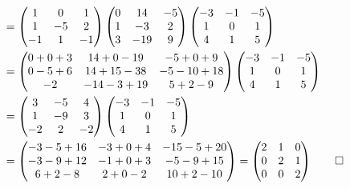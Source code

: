 \begin{loesung}
\begin{align*}
&=
\begin{pmatrix}
   1&  0&  1\\
   1& -5&  2\\
  -1&  1& -1
\end{pmatrix}
\begin{pmatrix}
    0&  14&  -5\\
    1&  -3&   2\\
    3& -19&   9
\end{pmatrix}
\begin{pmatrix}
  -3& -1& -5\\
   1&  0&  1\\
   4&  1&  5
\end{pmatrix}
\\
&=
\begin{pmatrix}
   0+0+3&14+0-19& -5+0+9\\
   0-5+6&14+15-38&-5-10+18\\
-2&-14-3+19&5+2-9
\end{pmatrix}
\begin{pmatrix}
  -3& -1& -5\\
   1&  0&  1\\
   4&  1&  5
\end{pmatrix}
\\
&=
\begin{pmatrix}
   3& -5&  4\\
   1& -9&  3\\
  -2&  2& -2
\end{pmatrix}
\begin{pmatrix}
  -3& -1& -5\\
   1&  0&  1\\
   4&  1&  5
\end{pmatrix}
\\
&=
\begin{pmatrix}
-3-5+16&-3+0+4&-15-5+20\\
-3-9+12&-1+0+3&-5-9+15\\
6+2-8&2+0-2&10+2-10
\end{pmatrix}
=
\begin{pmatrix}
2&1&0\\
0&2&1\\
0&0&2
\end{pmatrix}
\qedhere
\end{align*}
\end{loesung}

